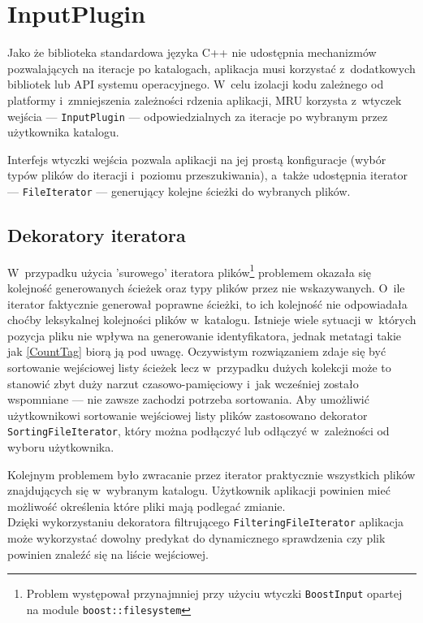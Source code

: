 \section{InputPlugin}
\par
Jako że biblioteka standardowa języka C++ nie udostępnia mechanizmów pozwalających na iteracje po katalogach, aplikacja musi korzystać z~dodatkowych bibliotek lub API systemu operacyjnego. W~celu izolacji kodu zależnego od platformy i~zmniejszenia zależności rdzenia aplikacji, MRU korzysta z~wtyczek wejścia --- \texttt{InputPlugin} --- odpowiedzialnych za iteracje po wybranym przez użytkownika katalogu.
\par
Interfejs wtyczki wejścia pozwala aplikacji na jej prostą konfiguracje (wybór typów plików do iteracji i~poziomu przeszukiwania), a~także udostępnia iterator --- \texttt{FileIterator} --- generujący kolejne ścieżki do wybranych plików.
\subsection{Dekoratory iteratora}
\par
 W~przypadku użycia 'surowego' iteratora plików\footnote{Problem występował przynajmniej przy użyciu wtyczki \texttt{BoostInput} opartej na module \texttt{boost::filesystem}} problemem okazała się kolejność generowanych ścieżek oraz typy plików przez nie wskazywanych.
 O~ile iterator faktycznie generował poprawne ścieżki, to ich kolejność nie odpowiadała choćby leksykalnej kolejności plików w~katalogu. Istnieje wiele sytuacji w~których pozycja pliku nie wpływa na generowanie identyfikatora, jednak metatagi takie jak \ref{CountTag} biorą ją pod uwagę. Oczywistym rozwiązaniem zdaje się być sortowanie wejściowej listy ścieżek lecz w~przypadku dużych kolekcji może to stanowić zbyt duży narzut czasowo-pamięciowy i~jak wcześniej zostało wspomniane --- nie zawsze zachodzi potrzeba sortowania. Aby umożliwić użytkownikowi sortowanie wejściowej listy plików zastosowano dekorator \texttt{SortingFileIterator}, który można podłączyć lub odłączyć w~zależności od wyboru użytkownika.

\par
Kolejnym problemem było zwracanie przez iterator praktycznie wszystkich plików znajdujących się w~wybranym katalogu. Użytkownik aplikacji powinien mieć możliwość określenia które pliki mają podlegać zmianie.\\
Dzięki wykorzystaniu dekoratora filtrującego \texttt{FilteringFileIterator} aplikacja może wykorzystać dowolny predykat do dynamicznego sprawdzenia czy plik powinien znaleźć się na liście wejściowej.

